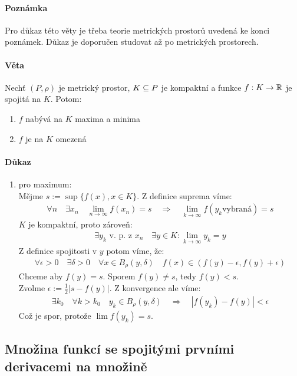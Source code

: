 \documentclass[a4paper,10pt]{article}
\begin{document}
\paragraph{Poznámka}
Pro důkaz této věty je třeba teorie metrických prostorů uvedená ke konci
poznámek. Důkaz je doporučen studovat až po metrických prostorech.
\paragraph{Věta}
Nechť $(P, \rho)$ je metrický prostor, $K \subseteq P$ je kompaktní a funkce
$f:K\to \mathbb{R}$ je spojitá na $K$. Potom:
\begin{enumerate}
	\item $f$ nabývá na $K$ maxima a minima
	\item $f$ je na $K$ omezená
\end{enumerate}
\paragraph{Důkaz} 
\begin{enumerate}
	\item pro maximum: \\
	Mějme $s := \sup\{f(x), x \in K\}$. Z definice suprema víme:
	\begin{align}
		\forall n \quad \exists x_n\quad \lim_{n\to\infty} f(x_n) = s
		\quad \Rightarrow \quad \lim_{k\to\infty} f(y_k \text{vybraná}) = s
	\end{align}
	$K$ je kompaktní, proto zároveň:
	\begin{align}
		\exists y_k \text{ v. p. z } x_n \quad \exists y \in K:
		\lim_{k\to\infty} y_k = y
	\end{align}
	Z definice spojitosti v $y$ potom víme, že:
	\begin{align}
		\forall \epsilon > 0 \quad \exists \delta > 0 \quad \forall x \in B_\rho(y,
		\delta) \quad f(x) \in (f(y) - \epsilon, f(y) + \epsilon)
	\end{align}
	Chceme aby $f(y) = s$. Sporem $f(y) \neq s$, tedy $f(y) < s$. \\
	Zvolme $\epsilon := \frac{1}{2} |s - f(y)|$. 
	Z konvergence ale víme:
	\begin{align}
		\exists k_0 \quad \forall k > k_0 \quad y_k \in B_\rho(y, \delta)
		\quad \Rightarrow \quad |f(y_k) - f(y)| < \epsilon
	\end{align}
	Což je spor, protože $\lim f(y_k) = s$.
\end{enumerate}


\subsection{Množina funkcí se spojitými prvními derivacemi na množině}
\setcounter{equation}{0}
\end{document}
